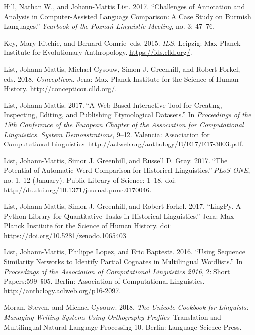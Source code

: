 \documentclass[
  a4paper,
  14pt,
  oneside,
  tablecaptionabove
]{scrbook}
\begin{document}
\nopagebreak\hangindent=0.7cm {\small Hill, Nathan W., and Johann-Mattis List. 2017. \enquote{Challenges of
Annotation and Analysis in Computer-Assisted Language Comparison: A Case
Study on Burmish Languages.} \emph{Yearbook of the Poznań Linguistic
Meeting}, no. 3: 47--76. }

\nopagebreak\hangindent=0.7cm {\small Key, Mary Ritchie, and Bernard Comrie, eds. 2015. \emph{IDS}. 
Leipzig: Max Planck Institute for Evolutionary Anthropology.
\url{https://ids.clld.org/}.  }

\nopagebreak\hangindent=0.7cm {\small List, Johann-Mattis, Michael Cysouw, Simon J. Greenhill, and Robert
Forkel, eds. 2018. \emph{Concepticon}.  Jena: Max Planck Institute for
the Science of Human History. \url{http://concepticon.clld.org/}.  }

\nopagebreak\hangindent=0.7cm {\small List, Johann-Mattis. 2017. \enquote{A Web-Based Interactive Tool for
Creating, Inspecting, Editing, and Publishing Etymological Datasets.} In
\emph{Proceedings of the 15th Conference of the European Chapter of the
Association for Computational Linguistics. System Demonstrations},
9--12. Valencia: Association for Computational Linguistics.
\url{http://aclweb.org/anthology/E/E17/E17-3003.pdf}.  }

\nopagebreak\hangindent=0.7cm {\small List, Johann-Mattis, Simon J. Greenhill, and Russell D. Gray. 2017.
\enquote{The Potential of Automatic Word Comparison for Historical
Linguistics.} \emph{PLoS ONE}, no. 1, 12 (January). Public Library of
Science: 1--18. doi:
\href{https://doi.org/http://dx.doi.org/10.1371/journal.pone.0170046}{http://dx.doi.org/10.1371/journal.pone.0170046}.
}

\nopagebreak\hangindent=0.7cm {\small List, Johann-Mattis, Simon J. Greenhill, and Robert Forkel. 2017.
\enquote{LingPy. A Python Library for Quantitative Tasks in Historical
Linguistics.} Jena: Max Planck Institute for the Science of Human
History. doi:
\href{https://doi.org/https://doi.org/10.5281/zenodo.1065403}{https://doi.org/10.5281/zenodo.1065403}.
}

\nopagebreak\hangindent=0.7cm {\small List, Johann-Mattis, Philippe Lopez, and Eric Bapteste. 2016.
\enquote{Using Sequence Similarity Networks to Identify Partial Cognates
in Multilingual Wordlists.} In \emph{Proceedings of the Association of
Computational Linguistics 2016}, 2: Short Papers:599--605. Berlin:
Association of Computational Linguistics.
\url{http://anthology.aclweb.org/p16-2097}.  }

\nopagebreak\hangindent=0.7cm {\small Moran, Steven, and Michael Cysouw. 2018. \emph{The Unicode Cookbook
for Linguists: Managing Writing Systems Using Orthography Profiles}. 
Translation and Multilingual Natural Language Processing 10. Berlin:
Language Science Press. }
\end{document}
